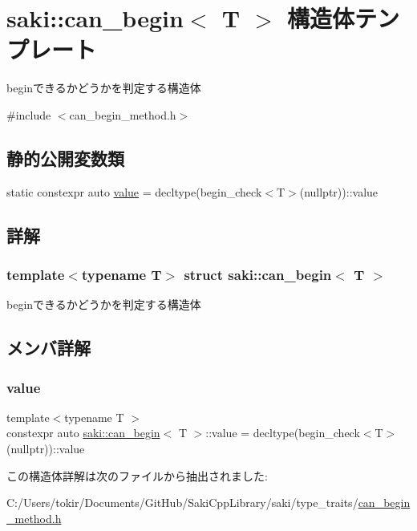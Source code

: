 \hypertarget{structsaki_1_1can__begin}{}\section{saki\+:\+:can\+\_\+begin$<$ T $>$ 構造体テンプレート}
\label{structsaki_1_1can__begin}


beginできるかどうかを判定する構造体  




{\ttfamily \#include $<$can\+\_\+begin\+\_\+method.\+h$>$}

\subsection*{静的公開変数類}
\begin{DoxyCompactItemize}
\item 
static constexpr auto \mbox{\hyperlink{structsaki_1_1can__begin_a6d16b8cbacbf7d9be197d09c517d503d}{value}} = decltype(begin\+\_\+check$<$T$>$(nullptr))\+::value
\end{DoxyCompactItemize}


\subsection{詳解}
\subsubsection*{template$<$typename T$>$\newline
struct saki\+::can\+\_\+begin$<$ T $>$}

beginできるかどうかを判定する構造体 

\subsection{メンバ詳解}
\mbox{\label{structsaki_1_1can__begin_a6d16b8cbacbf7d9be197d09c517d503d}} 
\subsubsection{\texorpdfstring{value}{value}}
{\footnotesize\ttfamily template$<$typename T $>$ \\
constexpr auto \mbox{\hyperlink{structsaki_1_1can__begin}{saki\+::can\+\_\+begin}}$<$ T $>$\+::value = decltype(begin\+\_\+check$<$T$>$(nullptr))\+::value\hspace{0.3cm}{\ttfamily [static]}}



この構造体詳解は次のファイルから抽出されました\+:\begin{DoxyCompactItemize}
\item 
C\+:/\+Users/tokir/\+Documents/\+Git\+Hub/\+Saki\+Cpp\+Library/saki/type\+\_\+traits/\mbox{\hyperlink{can__begin__method_8h}{can\+\_\+begin\+\_\+method.\+h}}\end{DoxyCompactItemize}
